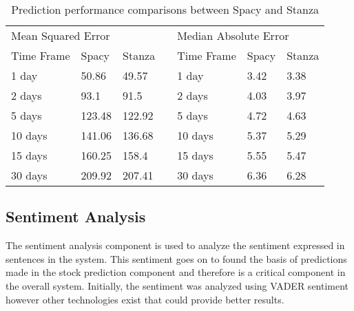         \begin{table}[h]
            \centering
            \begin{tabular}{|l|l|l|l|l|l|l|}
            \multicolumn{3}{l}{Mean Squared Error}                                                                                                & \multicolumn{1}{l}{} & \multicolumn{3}{l}{Median Absolute Error}                                                       \\ 
            \cline{1-3}\cline{5-7}
            Time Frame & Spacy                                                                        & Stanza                                    &                      & Time Frame & Spacy                                   & Stanza                                   \\ 
            \cline{1-3}\cline{5-7}
            1 day      & {50.86}                                     & {49.57}  &                      & 1 day      & {3.42} & {3.38}  \\ 
            \cline{1-3}\cline{5-7}
            2 days     & {}{93.1}   & {91.5}   &                      & 2 days     & {4.03} & {3.97}  \\ 
            \cline{1-3}\cline{5-7}
            5 days     & {}{123.48} & {122.92} &                      & 5 days     & {4.72} & {4.63}  \\ 
            \cline{1-3}\cline{5-7}
            10 days    & {141.06}                                    & {136.68} &                      & 10 days    & {5.37} & {5.29}  \\ 
            \cline{1-3}\cline{5-7}
            15 days    & {}{160.25} & {158.4}  &                      & 15 days    & {5.55} & {5.47}  \\ 
            \cline{1-3}\cline{5-7}
            30 days    & {}{209.92} & {207.41} &                      & 30 days    & {6.36} & {6.28}  \\
            \cline{1-3}\cline{5-7}
            \end{tabular}
            \bigskip
            \caption{Prediction performance comparisons between Spacy and Stanza}
            \label{Table: NER_Performance}
        \end{table}
        
        \subsection{Sentiment Analysis}
        \label{eval:sentiment}
        The sentiment analysis component is used to analyze the sentiment expressed in sentences in the system. This sentiment goes on to found the basis of predictions made in the stock prediction component and therefore is a critical component in the overall system. Initially, the sentiment was analyzed using VADER sentiment \citep{Technology:Vader} however other technologies exist that could provide better results.
        
